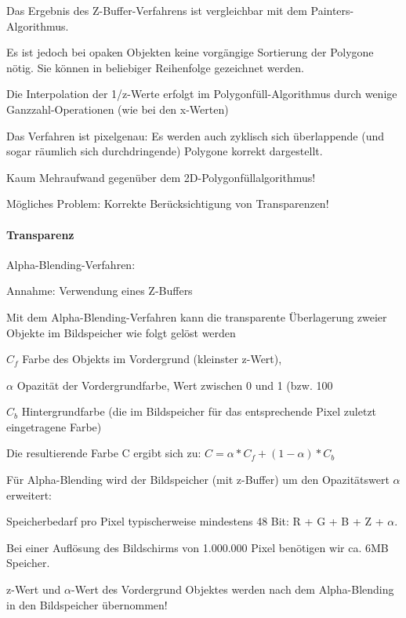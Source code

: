 \documentclass[landscape]{article}
\begin{document}
\begin{multicols}{3}
  
  \begin{itemize*}
    \item Das Ergebnis des Z-Buffer-Verfahrens ist vergleichbar mit dem Painters-Algorithmus.
    \item Es ist jedoch bei opaken Objekten keine vorgängige Sortierung der Polygone nötig. Sie können in beliebiger Reihenfolge gezeichnet werden.
    \item Die Interpolation der 1/z-Werte erfolgt im Polygonfüll-Algorithmus durch wenige Ganzzahl-Operationen (wie bei den x-Werten)
    \item Das Verfahren ist pixelgenau: Es werden auch zyklisch sich überlappende (und sogar räumlich sich durchdringende) Polygone korrekt dargestellt.
    \item Kaum Mehraufwand gegenüber dem 2D-Polygonfüllalgorithmus!
    \item Mögliches Problem: Korrekte Berücksichtigung von Transparenzen!
  \end{itemize*}
  
  \paragraph{Transparenz}
  Alpha-Blending-Verfahren: 
  \begin{itemize*}
    \item Annahme: Verwendung eines Z-Buffers
    \item Mit dem Alpha-Blending-Verfahren kann die transparente Überlagerung zweier Objekte im Bildspeicher wie folgt gelöst werden
    \item $C_f$ Farbe des Objekts im Vordergrund (kleinster z-Wert),
    \item $\alpha$ Opazität der Vordergrundfarbe, Wert zwischen 0 und 1 (bzw. 100%
    \item $C_b$ Hintergrundfarbe (die im Bildspeicher für das entsprechende Pixel zuletzt eingetragene Farbe)
    \item Die resultierende Farbe C ergibt sich zu: $C=\alpha*C_f+(1-\alpha)*C_b$
    \item Für Alpha-Blending wird der Bildspeicher (mit z-Buffer) um den Opazitätswert $\alpha$ erweitert:
    \item Speicherbedarf pro Pixel typischerweise mindestens 48 Bit: R + G + B + Z + $\alpha$.
    \item Bei einer Auflösung des Bildschirms von 1.000.000 Pixel benötigen wir ca. 6MB Speicher.
    \item z-Wert und $\alpha$-Wert des Vordergrund Objektes werden nach dem Alpha-Blending in den Bildspeicher übernommen!
  \end{itemize*}
  

\end{multicols}
\end{document}

